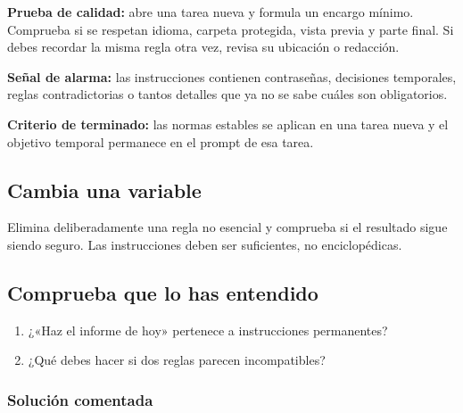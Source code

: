 \documentclass[10pt,a4paper,openany]{book}
\providecommand{\tightlist}{\setlength{\itemsep}{0.18em}\setlength{\parskip}{0pt}}
\begin{document}
\begin{tipbox}

\textbf{Prueba de calidad:} abre una tarea nueva y formula un encargo
mínimo. Comprueba si se respetan idioma, carpeta protegida, vista previa
y parte final. Si debes recordar la misma regla otra vez, revisa su
ubicación o redacción.

\end{tipbox}

\begin{warningbox}

\textbf{Señal de alarma:} las instrucciones contienen contraseñas,
decisiones temporales, reglas contradictorias o tantos detalles que ya
no se sabe cuáles son obligatorios.

\end{warningbox}

\begin{successbox}

\textbf{Criterio de terminado:} las normas estables se aplican en una
tarea nueva y el objetivo temporal permanece en el prompt de esa tarea.

\end{successbox}

\subsection{Cambia una variable}\label{cambia-una-variable-15}

Elimina deliberadamente una regla no esencial y comprueba si el
resultado sigue siendo seguro. Las instrucciones deben ser suficientes,
no enciclopédicas.

\subsection{Comprueba que lo has
entendido}\label{comprueba-que-lo-has-entendido-15}

\begin{enumerate}
\def\labelenumi{\arabic{enumi}.}
\tightlist
\item
  ¿«Haz el informe de hoy» pertenece a instrucciones permanentes?
\item
  ¿Qué debes hacer si dos reglas parecen incompatibles?
\end{enumerate}

\subsubsection{Solución comentada}\label{soluciuxf3n-comentada-16}
\end{document}
